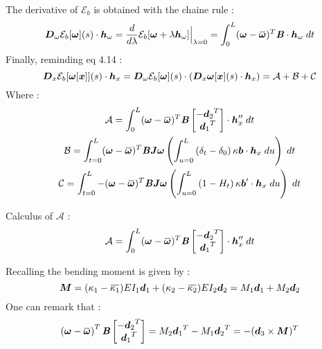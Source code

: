 The derivative of $\mathcal{E}_b$ is obtained with the chaine rule :
\begin{equation}
	\pdiffof{\omega}{\mathcal{E}_b[\vect{\omega}]}{s}{\vect{h}_\omega}
		= \frac{d}{d\lambda} \mathcal{E}_b[\vect{\omega} + \lambda \vect{h}_\omega]\Bigr|_{\lambda = 0}
		= \int_{0}^{L} (\vect{\omega} - \overbar{\vect{\omega}})^T \mat{B} \cdot \vect{h}_\omega \;dt
\end{equation}
Finally, reminding eq 4.14 :
\begin{equation}
	\boldsymbol{D}_x\mathcal{E}_b[\boldsymbol{\omega}[\boldsymbol{x}]](s)\cdot\boldsymbol{h}_x
	= \boldsymbol{D}_\omega\mathcal{E}_b[\boldsymbol{\omega}](s)\cdot(\boldsymbol{D}_x\boldsymbol{\omega}[\boldsymbol{x}](s)\cdot\boldsymbol{h}_x)
	= \mathcal{A} +\mathcal{B}+\mathcal{C}
\end{equation}
Where :
\begin{subequations}
	\begin{gather}
	\mathcal{A} = \int_{0}^{L} (\vect{\omega} - \overbar{\vect{\omega}})^T \mat{B}
	\begin{bmatrix}
		-{\vect{d}_2}^T\\
		{\vect{d}_1}^T\\
	\end{bmatrix}\cdot \vect{h}_x'' \;dt \\
	\mathcal{B} =
	\int_{t=0}^{L} (\vect{\omega} - \overbar{\vect{\omega}})^T \mat{B}\mat{J}\vect{\omega}
	\left(\int_{u=0}^L \left(\delta_t-\delta_0\right)\kappa\vect{b}\cdot  \vect{h}_x \;du\right)
	\;dt\\
	\mathcal{C} =
	\int_{t=0}^{L} -(\vect{\omega} - \overbar{\vect{\omega}})^T \mat{B}\mat{J}\vect{\omega}
	\left(\int_{u=0}^L \left(1-H_t\right)\kappa\vect{b}'\cdot  \vect{h}_x \;du\right)
	\;dt
	\end{gather}
\end{subequations}

Calculus of $\mathcal{A}$ :
\begin{equation}
	\mathcal{A}
	= \int_{0}^{L} (\vect{\omega} - \overbar{\vect{\omega}})^T \mat{B}
		\begin{bmatrix}
			-{\vect{d}_2}^T\\
			{\vect{d}_1}^T\\
		\end{bmatrix}\cdot \vect{h}_x'' \;dt \\
\end{equation}

Recalling the bending moment is given by : 
\begin{equation}
	\vect{M}  
	= (\kappa_1 - \overbar{\kappa_1})EI_1\vect{d}_1 + (\kappa_2 - \overbar{\kappa_2})EI_2\vect{d}_2
	= M_1\vect{d}_1 + M_2\vect{d}_2
\end{equation}
One can remark that :
\begin{equation}
	\left(\vect{\omega} - \overbar{\vect{\omega}}\right)^T \mat{B} 
		\begin{bmatrix}
			-{\vect{d}_2}^T\\
			{\vect{d}_1}^T\\
		\end{bmatrix}
	=  M_2{\vect{d}_1}^T - M_1{\vect{d}_2}^T
	= - ({\vect{d}_3} \times \vect{M})^T
\end{equation}

